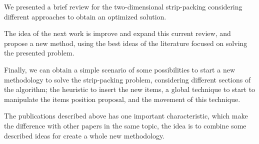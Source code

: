 We presented  a brief review for the two-dimensional strip-packing
considering different approaches to obtain an optimized solution.

The idea of the next work is improve and expand this current review,
and propose a new method, using the best ideas of the literature
focused on solving the presented problem.

Finally,
we can obtain a simple scenario
of some possibilities to start a new methodology
to solve the strip-packing problem,
considering different sections of the algorithm;
the heuristic to insert the new items,
a global technique to start to manipulate the items
position proposal, and the movement of this technique.

The publications described above
has one important characteristic, which make the difference
with other papers in the same topic,
the idea is to combine some described ideas for create a whole
new methodology.
